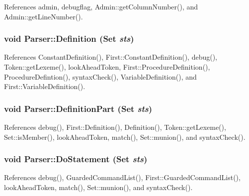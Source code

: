 References admin, debugflag, Admin::getColumnNumber(), and Admin::getLineNumber().

\hypertarget{classParser_aef0bb75e13a569ffde9f8a56625aeb41}{
\subsubsection[{Definition}]{\setlength{\rightskip}{0pt plus 5cm}void Parser::Definition ({\bf Set} {\em sts})}}
\label{classParser_aef0bb75e13a569ffde9f8a56625aeb41}


References ConstantDefinition(), First::ConstantDefinition(), debug(), Token::getLexeme(), lookAheadToken, First::ProcedureDefinition(), ProcedureDefintion(), syntaxCheck(), VariableDefinition(), and First::VariableDefinition().

\hypertarget{classParser_a481fd10039485563c664099d5ace6428}{
\subsubsection[{DefinitionPart}]{\setlength{\rightskip}{0pt plus 5cm}void Parser::DefinitionPart ({\bf Set} {\em sts})}}
\label{classParser_a481fd10039485563c664099d5ace6428}


References debug(), First::Definition(), Definition(), Token::getLexeme(), Set::isMember(), lookAheadToken, match(), Set::munion(), and syntaxCheck().

\hypertarget{classParser_ae1ced275b4dafa58b751c66333a41f98}{
\subsubsection[{DoStatement}]{\setlength{\rightskip}{0pt plus 5cm}void Parser::DoStatement ({\bf Set} {\em sts})}}
\label{classParser_ae1ced275b4dafa58b751c66333a41f98}


References debug(), GuardedCommandList(), First::GuardedCommandList(), lookAheadToken, match(), Set::munion(), and syntaxCheck().

